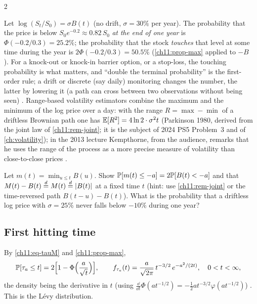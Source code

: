 \begin{paracol}{2}
\begin{finance}
Let $\log(S_t/S_0)=\sigma B(t)$ (no drift, $\sigma=30\%$ per year). The probability that the price is below $S_0e^{-0.2}\approx0.82\,S_0$ \emph{at the end of
one year} is $\Phi(-0.2/0.3)=25.2\%$; the probability that the stock \emph{touches} that level at some time during the year is
$2\Phi(-0.2/0.3)=50.5\%$ (\cref{ch11:prop-max} applied to $-B$). For a knock-out or knock-in
barrier option, or a stop-loss, the touching probability is what matters, and ``double the terminal probability'' is
the first-order rule; a drift or discrete (say daily) monitoring changes the number, the latter by lowering it
(a path can cross between two observations without being seen) . Range-based volatility estimators
combine the maximum and the minimum of the log price over a day: with the range $R=\max-\min$ of a driftless Brownian path one has
$\mathbb{E}[R^2]=4\ln2\cdot\sigma^2t$ (Parkinson 1980, derived from the joint law of \cref{ch11:rem-joint}; it is the subject of 2024 PS5 Problem~3 and
of \cref{ch:volatility}); in the 2013 lecture Kempthorne, from the audience, remarks that he uses the range of the process as a more precise measure of volatility than close-to-close prices
.
\end{finance}

\begin{exercise}\label{ch11:ex-refl}
Let $m(t)=\min_{u\le t}B(u)$. Show $\mathbb{P}[m(t)\le-a]=2\mathbb{P}[B(t)<-a]$ and that $M(t)-B(t)\stackrel{d}{=} M(t)\stackrel{d}{=}|B(t)|$ at a fixed time $t$ (hint: use \cref{ch11:rem-joint} or the
time-reversed path $B(t-u)-B(t)$). What is the probability that a driftless log price with $\sigma=25\%$ never falls below $-10\%$ during one year?
\end{exercise}

\subsection{First hitting time}
By \eqref{ch11:eq-tauM} and \cref{ch11:prop-max},
\begin{equation}\label{ch11:eq-hitcdf}
  \mathbb{P}[\tau_a\le t]=2\Bigl[1-\Phi\Bigl(\frac a{\sqrt t}\Bigr)\Bigr],\qquad
  f_{\tau_a}(t)=\frac{a}{\sqrt{2\pi}}\,t^{-3/2}\,e^{-a^2/(2t)},\quad0<t<\infty,
\end{equation}
\sloppy the density being the derivative in $t$ (using $\frac{\dd}{\dd t}\Phi(a t^{-1/2})=-\tfrac12 a t^{-3/2}\varphi(a t^{-1/2})$)
. This is the L\'evy distribution.


\end{paracol}

